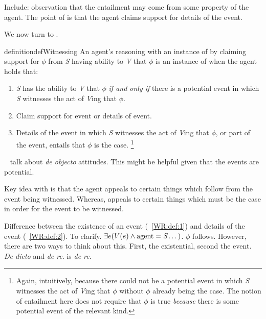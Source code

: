 \subsubsection{\WR{}}
\label{sec:wr-1}

\begin{note}[\WR{} def.]
  {
    \color{red}
    Include: observation that the entailment may come from some property of the agent.
    The point of \WR{} is that the agent claims support for details of the event.
  }

  We now turn to \WR{}.
  \begin{restatable}[\WR{}]{definition}{defWitnessing}\label{WR:def}
        An agent's reasoning with an instance of  by claiming support for \(\phi\) from \emph{S} having ability to \emph{V} that \(\phi\) is an instance of \emph{\WR{}} when the agent holds that:
    \begin{enumerate}
    \item\label{WR:def:1} \emph{S} has the ability to \emph{V} that \(\phi\) \emph{if and only if} there is a potential event in which \emph{S} witnesses the act of \emph{V}ing that \(\phi\).
    \item\label{WR:def:2} Claim support for event or details of event.
    \item\label{WR:def:3} Details of the event in which \emph{S} witnesses the act of \emph{V}ing that \(\phi\), or part of the event, entails that \(\phi\) is the case.\nolinebreak
      \footnote{Again, intuitively, because there could not be a potential event in which \emph{S} witnesses the act of \emph{V}ing that \(\phi\) without \(\phi\) already being the case.
      The notion of entailment here does not require that \(\phi\) is true \emph{because} there is some potential event of the relevant kind.}
    \end{enumerate}
  \end{restatable}

  {
    \color{red}
    ~\textcite{Rebuschi:2011ub} talk about \emph{de objecto} attitudes.
    This might be helpful given that the events are potential.
  }

  {
    \color{red}
    Key idea with \WR{} is that the agent appeals to certain things which follow from the event being witnessed.
    Whereas, \AR{} appeals to certain things which must be the case in order for the event to be witnessed.
  }

  {
    \color{red}
    Difference between the existence of an event (~\ref{WR:def:1}) and details of the event (~\ref{WR:def:2}).
    To clarify.
    \(\exists e(V(e) \land \text{agent} = \emph{S} \dots)\).
    \(\phi\) follows.
    However, there are two ways to think about this.
    First, the existential, second the event.
    \emph{De dicto} and \emph{de re}.
    \WR{} is \emph{de re}.

}
\end{note}
